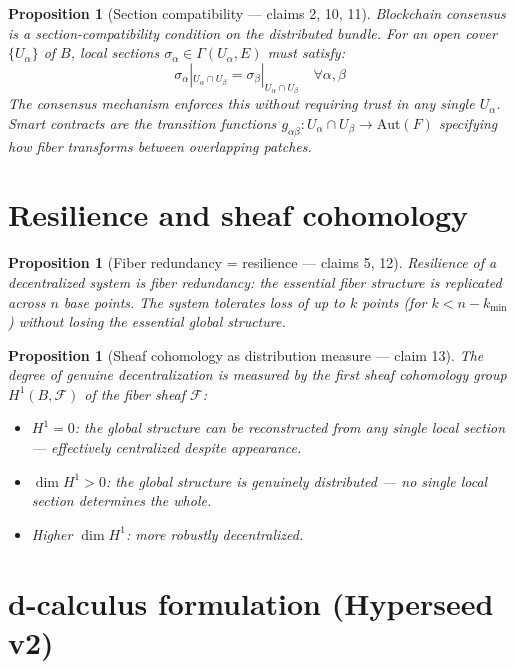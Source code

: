 \documentclass[11pt,a4paper]{article}
\newtheorem{proposition}[definition]{Proposition}
\begin{document}
\begin{proposition}[Section compatibility --- claims 2, 10, 11]
\label{prop:blockchain}
Blockchain consensus is a section-compatibility condition on the
distributed bundle. For an open cover $\{U_\alpha\}$ of $B$, local
sections $\sigma_\alpha \in \Gamma(U_\alpha, E)$ must satisfy:
\[
  \sigma_\alpha|_{U_\alpha \cap U_\beta}
    = \sigma_\beta|_{U_\alpha \cap U_\beta}
  \quad \forall \alpha, \beta
\]
The consensus mechanism enforces this without requiring trust in any single
$U_\alpha$. Smart contracts are the transition functions
$g_{\alpha\beta}: U_\alpha \cap U_\beta \to \mathrm{Aut}(F)$ specifying
how fiber transforms between overlapping patches.
\end{proposition}

\section{Resilience and sheaf cohomology}

\begin{proposition}[Fiber redundancy = resilience --- claims 5, 12]
\label{prop:resilience}
Resilience of a decentralized system is fiber redundancy: the essential
fiber structure is replicated across $n$ base points. The system tolerates
loss of up to $k$ points (for $k < n - k_{\min}$) without losing the
essential global structure.
\end{proposition}

\begin{proposition}[Sheaf cohomology as distribution measure --- claim 13]
\label{prop:cohomology}
The degree of genuine decentralization is measured by the first sheaf
cohomology group $H^1(B, \mathcal{F})$ of the fiber sheaf $\mathcal{F}$:
\begin{itemize}
  \item $H^1 = 0$: the global structure can be reconstructed from any
    single local section --- effectively centralized despite appearance.
  \item $\dim H^1 > 0$: the global structure is genuinely distributed ---
    no single local section determines the whole.
  \item Higher $\dim H^1$: more robustly decentralized.
\end{itemize}
\end{proposition}

\section{d-calculus formulation (Hyperseed v2)}
\end{document}
